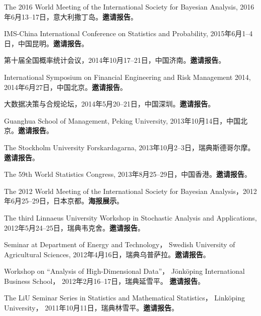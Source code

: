 \documentclass[twoside,a4paper,11pt]{article}
\begin{document}
\begin{etaremune}[itemsep=0ex,parsep=0pt]
\item The 2016 World Meeting of the International Society for Bayesian Analysis, 2016年6月13--17日，意大利撒丁岛。\textbf{邀请报告}。

\item IMS-China International Conference on Statistics and Probability, 2015年6月1--4日，中国昆明。\textbf{邀请报告}。

\item 第十届全国概率统计会议，2014年10月17--21日，中国济南。\textbf{邀请报告}。

\item International Symposium on Financial Engineering and Risk Management 2014, 2014年6月27日，中国北京。\textbf{邀请报告}。

\item 大数据决策与合规论坛，2014年5月20--21日，中国深圳。\textbf{邀请报告}。

\item Guanghua School of Management, Peking University, 2013年10月14日，中国北京。\textbf{邀请报告}。

\item The Stockholm University Forskardagarna, 2013年10月2--3日，瑞典斯德哥尔摩。\textbf{邀请报告}。

\item The 59th World Statistics Congress, 2013年8月25--29日，中国香港。\textbf{邀请报告}。

\item The 2012 World Meeting of the International Society for Bayesian
  Analysis，2012年6月25--29日，日本京都。\textbf{海报展示}。

\item The third Linnaeus University Workshop in Stochastic Analysis and
  Applications, 2012年5月24--25日，瑞典韦克舍。\textbf{邀请报告}。

\item Seminar at Department of Energy and Technology， Swedish
  University of Agricultural Sciences, 2012年4月16日，瑞典乌普萨拉。\textbf{邀请报告}。

\item Workshop on ``Analysis of High-Dimensional Data''，
  Jönköping International Business School， 2012年2月16--17日，瑞典延雪平。
  \textbf{邀请报告}。

\item The LiU Seminar Series in Statistics and Mathematical Statistics，
  Linköping University， 2011年10月11日，瑞典林雪平。\textbf{邀请报告}。


\end{etaremune}
\end{document}
